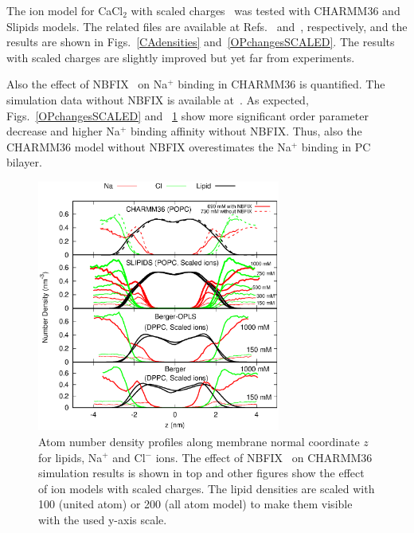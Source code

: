 \documentclass[twoside,twocolumn,9pt]{article}
\begin{document}
The ion model for CaCl$_2$ with scaled charges~\cite{kohagen14} was tested with CHARMM36 and Slipids models.
The related files are available at Refs.~ and~,
respectively, and the results are shown in Figs.~\ref{CAdensities} and~\ref{OPchangesSCALED}.
The results with scaled charges are slightly improved but yet far from experiments.

Also the effect of NBFIX~\cite{venable13} on Na$^+$ binding in CHARMM36 is quantified.
The simulation data without NBFIX is available at~\cite{charmmPOPC350mMNaClnoNBFIXfiles}.
As expected, Figs.~\ref{OPchangesSCALED} and ~\ref{NAdensitySCALED} show 
more significant order parameter decrease and higher Na$^+$ binding affinity
without NBFIX. Thus, also the CHARMM36 model without NBFIX overestimates the
Na$^+$ binding in PC bilayer.




\begin{figure}[h]
  \centering
  \includegraphics[width=8cm]{../Fig/NAdensitiesSCALED.eps} 
  \caption{\label{NAdensitySCALED}
    Atom number density profiles along membrane normal coordinate $z$ for lipids, Na$^+$ and Cl$^-$ ions. 
    The effect of NBFIX~\cite{venable13} on CHARMM36 simulation results is shown in top and other figures show the
    effect of ion models with scaled charges. The lipid densities are scaled with 100 (united atom) or 200 (all atom model) to make them visible with the used y-axis scale.
}
\end{figure}
\end{document}

